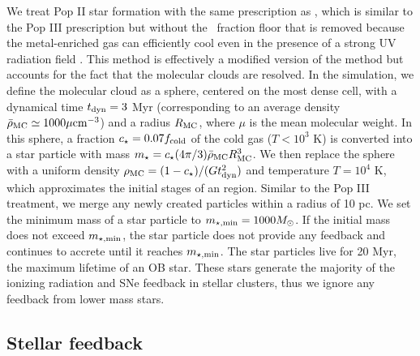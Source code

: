 \documentclass[apjl]{emulateapj}
\begin{document}
%

We treat Pop II star formation with the same prescription as
\citet{Wise09}, which is similar to the Pop III prescription but
without the \hh~fraction floor that is removed because the
metal-enriched gas can efficiently cool even in the presence of a
strong UV radiation field \citep[e.g.][]{Safranek10}.  This method is
effectively a modified version of the \citet{Cen92} method but
accounts for the fact that the molecular clouds are resolved.  In the
simulation, we define the molecular cloud as a sphere, centered on the
most dense cell, with a dynamical time $t_{\rm dyn} = 3$ Myr
(corresponding to an average density $\bar{\rho}_{\rm MC} \simeq
1000\mu \cubecm$) and a radius $R_{\rm MC}$, where $\mu$ is the mean
molecular weight.  In this sphere, a fraction $c_\star = 0.07 f_{\rm
  cold}$ of the cold gas ($T < 10^3$ K) is converted into a star
particle with mass $m_\star = c_\star (4\pi/3) \bar{\rho}_{\rm MC}
R_{\rm MC}^3$.  We then replace the sphere with a uniform density
$\rho_{\rm MC} = (1 - c_\star) / (Gt_{\rm dyn}^2)$ and temperature $T
= 10^4$ K, which approximates the initial stages of an 
region.  Similar to the Pop III treatment, we merge any newly created
particles within a radius of 10 pc.  We set the minimum mass of a star
particle to $m_{\rm \star, min} = 1000 \Ms$.  If the initial mass does
not exceed $m_{\rm \star, min}$, the star particle does not provide
any feedback and continues to accrete until it reaches $m_{\rm \star,
  min}$.  The star particles live for 20 Myr, the maximum lifetime of
an OB star.  These stars generate the majority of the ionizing
radiation and SNe feedback in stellar clusters, thus we ignore any
feedback from lower mass stars.

\subsection{Stellar feedback}
\end{document}
